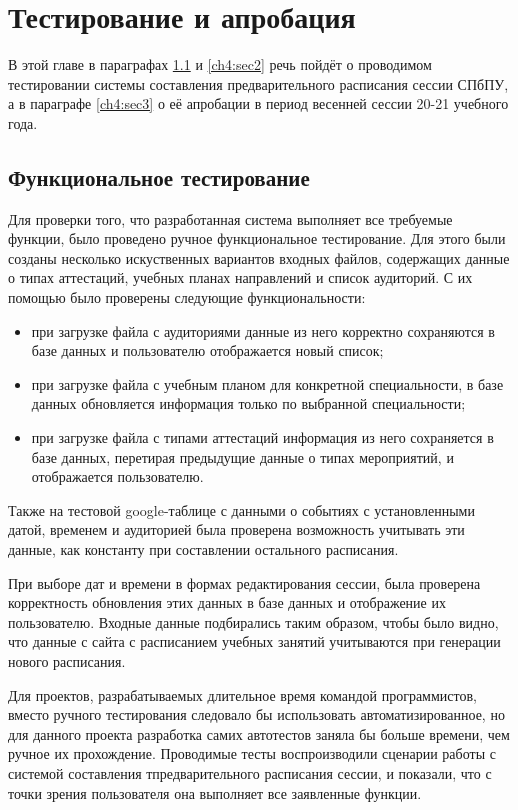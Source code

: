 \chapter{Тестирование и апробация} \label{ch4}

В этой главе в параграфах \ref{ch4:sec1} и \ref{ch4:sec2} речь пойдёт о проводимом тестировании системы составления предварительного расписания сессии СПбПУ, а в параграфе \ref{ch4:sec3} о её апробации в период весенней сессии 20-21 учебного года.

\section{Функциональное тестирование} \label{ch4:sec1}
Для проверки того, что разработанная система выполняет все требуемые функции, было проведено ручное функциональное тестирование. Для этого были созданы несколько искуственных вариантов входных файлов, содержащих данные о типах аттестаций, учебных планах направлений и список аудиторий. С их помощью было проверены следующие функциональности:
\begin{itemize}
	\item при загрузке файла с аудиториями данные из него корректно сохраняются в базе данных и пользователю отображается новый список;
	\item при загрузке файла с учебным планом для конкретной специальности, в базе данных обновляется информация только по выбранной специальности;
	\item при загрузке файла с типами аттестаций информация из него сохраняется в базе данных, перетирая предыдущие данные о типах мероприятий, и отображается пользователю.
\end{itemize} 	

Также на тестовой google-таблице с данными о событиях с установленными датой, временем и аудиторией была проверена возможность учитывать эти данные, как константу при составлении остального расписания.

При выборе дат и времени в формах редактирования сессии, была проверена корректность обновления этих данных в базе данных и отображение их пользователю. Входные данные подбирались таким образом, чтобы было видно, что данные с сайта с расписанием учебных занятий \cite{ruz} учитываются при генерации нового расписания.

Для проектов, разрабатываемых длительное время командой программистов, вместо ручного тестирования следовало бы использовать автоматизированное, но для данного проекта разработка самих автотестов заняла бы больше времени, чем ручное их прохождение. Проводимые тесты воспроизводили сценарии работы с системой составления тпредварительного расписания сессии, и показали, что с точки зрения пользователя она выполняет все заявленные функции.


